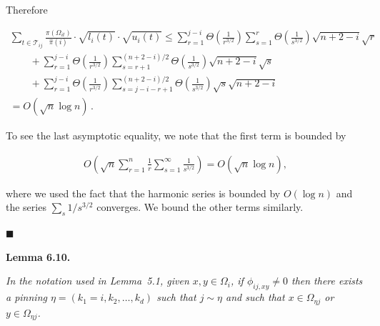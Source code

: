 \documentclass[10pt,a4paper]{article}
\begin{document}
Therefore\par


\[\begin{gathered}
\displaystyle\sum_{t\in\mathcal{T}_{ij}}\frac{\pi(\Omega_{it})}{\hat{\pi}(i)}\cdot\sqrt{l_{i}(t)}\cdot\sqrt{u_{i}(t)} \displaystyle\leq\sum_{r=1}^{j-i}\Theta\left(\frac{1}{r^{3/2}}\right)\sum_{s=1}^{r}\Theta\left(\frac{1}{s^{3/2}}\right)\sqrt{n+2-i}\sqrt{r} \\
\displaystyle\qquad+\sum_{r=1}^{j-i}\Theta\left(\frac{1}{r^{3/2}}\right)\sum_{s=r+1}^{(n+2-i)/2}\Theta\left(\frac{1}{s^{3/2}}\right)\sqrt{n+2-i}\sqrt{s} \\
\displaystyle\qquad+\sum_{r=1}^{j-i}\Theta\left(\frac{1}{r^{3/2}}\right)\sum_{s=j-i-r+1}^{(n+2-i)/2}\Theta\left(\frac{1}{s^{3/2}}\right)\sqrt{s}\sqrt{n+2-i} \\
\displaystyle=O\left(\sqrt{n}\log n\right)\,.
\end{gathered}\]


To see the last asymptotic equality, we note that the first term is bounded by\par


\[\begin{gathered}
O\left(\sqrt{n}\sum_{r=1}^{n}\frac{1}{r}\sum_{s=1}^{\infty}\frac{1}{s^{3/2}}\right)=O(\sqrt{n}\log n),
\end{gathered}\]


where we used the fact that the harmonic series is bounded by $O(\log n)$ and the series $\sum_{s}1/s^{3/2}$ converges. We bound the other terms similarly.\par




\ensuremath{\blacksquare}\par






\par\medskip\noindent\textbf{\textbf{Lemma 6.10}\textbf{.}}\par



\emph{In the notation used in Lemma 5.1, given $x,y\in\Omega_{i}$, if $\phi_{ij,xy}\neq 0$ then there exists a pinning $\eta=(k_{1}=i,k_{2},\dots,k_{d})$ such that $j\sim\eta$ and such that $x\in\Omega_{\eta j}$ or $y\in\Omega_{\eta j}$.}\par



\end{document}
